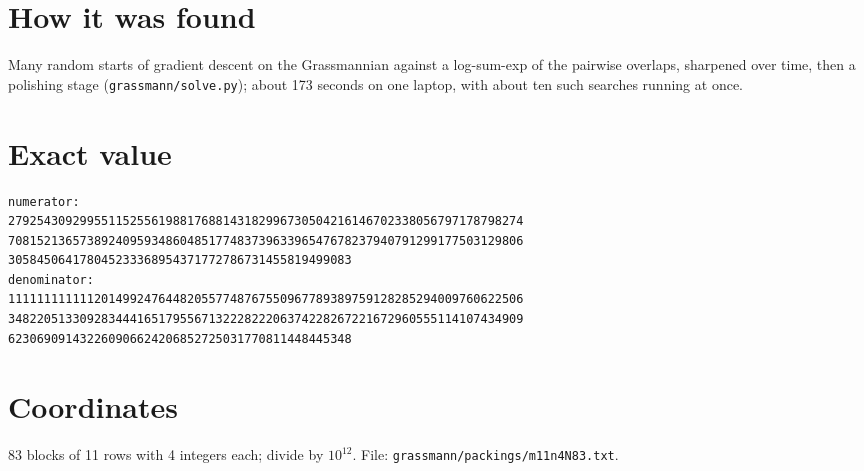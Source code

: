 \documentclass[11pt,a4paper]{article}
\begin{document}
\section{How it was found}
Many random starts of gradient descent on the Grassmannian against a log-sum-exp of the pairwise overlaps, sharpened over time, then a polishing stage (\texttt{grassmann/solve.py}); about 173 seconds on one laptop, with about ten such searches running at once.


\appendix
\section{Exact value}
{\small
\begin{verbatim}
numerator:
279254309299551152556198817688143182996730504216146702338056797178798274
708152136573892409593486048517748373963396547678237940791299177503129806
305845064178045233368954371772786731455819499083
denominator:
111111111111201499247644820557748767550967789389759128285294009760622506
348220513309283444165179556713222822206374228267221672960555114107434909
623069091432260906624206852725031770811448445348
\end{verbatim}}

\section{Coordinates}
83 blocks of 11 rows with 4 integers each; divide by $10^{12}$. File: \texttt{grassmann/packings/m11n4N83.txt}.
{\tiny
\begin{multicols}{3}
\end{multicols}}
\end{document}
